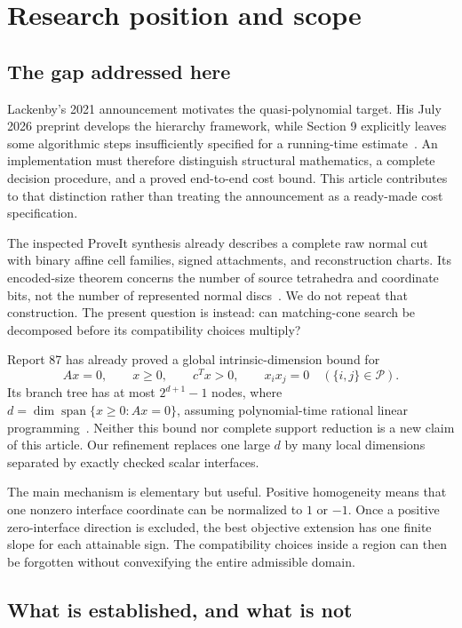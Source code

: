 \section{Research position and scope}
\label{sec:context}

\subsection{The gap addressed here}

Lackenby's 2021 announcement motivates the quasi-polynomial target. His July
2026 preprint develops the hierarchy framework, while Section 9 explicitly
leaves some algorithmic steps insufficiently specified for a running-time
estimate~\cite{lacktalk,lack2026}. An implementation must therefore distinguish
structural mathematics, a complete decision procedure, and a proved end-to-end
cost bound. This article contributes to that distinction rather than treating
the announcement as a ready-made cost specification.

The inspected ProveIt synthesis already describes a complete raw normal cut
with binary affine cell families, signed attachments, and reconstruction charts.
Its encoded-size theorem concerns the number of source tetrahedra and coordinate
bits, not the number of represented normal discs~\cite{repocut}. We do not
repeat that construction. The present question is instead: can matching-cone
search be decomposed before its compatibility choices multiply?

Report 87 has already proved a global intrinsic-dimension bound for
\[
 Ax=0,\qquad x\geq0,\qquad c^Tx>0,\qquad x_ix_j=0
 \quad(\{i,j\}\in\mathcal P).
\]
Its branch tree has at most $2^{d+1}-1$ nodes, where
$d=\dim\operatorname{span}\{x\geq0:Ax=0\}$, assuming polynomial-time rational
linear programming~\cite{repo87}. Neither this bound nor complete support
reduction is a new claim of this article. Our refinement replaces one large
$d$ by many local dimensions separated by exactly checked scalar interfaces.

The main mechanism is elementary but useful. Positive homogeneity means that
one nonzero interface coordinate can be normalized to $1$ or $-1$. Once a
positive zero-interface direction is excluded, the best objective extension
has one finite slope for each attainable sign. The compatibility choices
inside a region can then be forgotten without convexifying the entire
admissible domain.

\subsection{What is established, and what is not}

